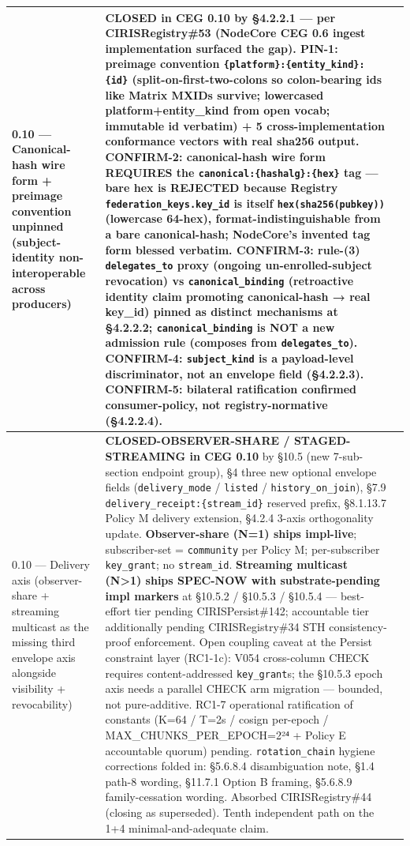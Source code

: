 \documentclass[10pt]{article}
\begin{document}
{\begin{longtable}{|p{5.33cm}|p{5.33cm}|p{5.33cm}|}
0.10 — Canonical-hash wire form + preimage convention unpinned (subject-identity non-interoperable across producers) & \textbf{CLOSED in CEG 0.10} by §4.2.2.1 — per CIRISRegistry\#53 (NodeCore CEG 0.6 ingest implementation surfaced the gap). \textbf{PIN-1}: preimage convention \texttt{\{platform\}:\{entity\_kind\}:\{id\}} (split-on-first-two-colons so colon-bearing ids like Matrix MXIDs survive; lowercased platform+entity\_kind from open vocab; immutable id verbatim) + 5 cross-implementation conformance vectors with real sha256 output. \textbf{CONFIRM-2}: canonical-hash wire form REQUIRES the \texttt{canonical:\{hashalg\}:\{hex\}} tag — bare hex is REJECTED because Registry \texttt{federation\_keys.key\_id} is itself \texttt{hex(sha256(pubkey))} (lowercase 64-hex), format-indistinguishable from a bare canonical-hash; NodeCore's invented tag form blessed verbatim. \textbf{CONFIRM-3}: rule-(3) \texttt{delegates\_to} proxy (ongoing un-enrolled-subject revocation) vs \texttt{canonical\_binding} (retroactive identity claim promoting canonical-hash → real key\_id) pinned as distinct mechanisms at §4.2.2.2; \texttt{canonical\_binding} is NOT a new admission rule (composes from \texttt{delegates\_to}). \textbf{CONFIRM-4}: \texttt{subject\_kind} is a payload-level discriminator, not an envelope field (§4.2.2.3). \textbf{CONFIRM-5}: bilateral ratification confirmed consumer-policy, not registry-normative (§4.2.2.4). &  \\ \hline
0.10 — Delivery axis (observer-share + streaming multicast as the missing third envelope axis alongside visibility + revocability) & \textbf{CLOSED-OBSERVER-SHARE / STAGED-STREAMING in CEG 0.10} by §10.5 (new 7-sub-section endpoint group), §4 three new optional envelope fields (\texttt{delivery\_mode} / \texttt{listed} / \texttt{history\_on\_join}), §7.9 \texttt{delivery\_receipt:\{stream\_id\}} reserved prefix, §8.1.13.7 Policy M delivery extension, §4.2.4 3-axis orthogonality update. \textbf{Observer-share (N=1) ships impl-live}; subscriber-set = \texttt{community} per Policy M; per-subscriber \texttt{key\_grant}; no \texttt{stream\_id}. \textbf{Streaming multicast (N>1) ships SPEC-NOW with substrate-pending impl markers} at §10.5.2 / §10.5.3 / §10.5.4 — best-effort tier pending CIRISPersist\#142; accountable tier additionally pending CIRISRegistry\#34 STH consistency-proof enforcement. Open coupling caveat at the Persist constraint layer (RC1-1c): V054 cross-column CHECK requires content-addressed \texttt{key\_grant}s; the §10.5.3 epoch axis needs a parallel CHECK arm migration — bounded, not pure-additive. RC1-7 operational ratification of constants (K=64 / T=2s / cosign per-epoch / MAX\_CHUNKS\_PER\_EPOCH=2²⁴ + Policy E accountable quorum) pending. \texttt{rotation\_chain} hygiene corrections folded in: §5.6.8.4 disambiguation note, §1.4 path-8 wording, §11.7.1 Option B framing, §5.6.8.9 family-cessation wording. Absorbed CIRISRegistry\#44 (closing as superseded). Tenth independent path on the 1+4 minimal-and-adequate claim. &  \\ \hline
\end{longtable}}
\end{document}
